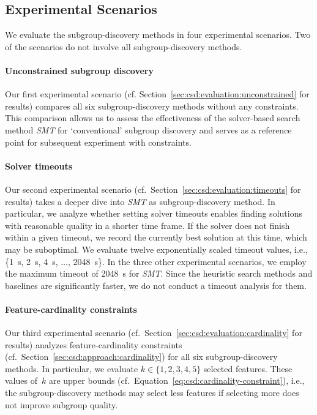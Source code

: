 \documentclass{article}
\theoremstyle{definition}
\begin{document}
\subsection{Experimental Scenarios}
\label{sec:csd:experimental-design:scenarios}

We evaluate the subgroup-discovery methods in four experimental scenarios.
Two of the scenarios do not involve all subgroup-discovery methods.

\paragraph{Unconstrained subgroup discovery}

Our first experimental scenario (cf. Section~\ref{sec:csd:evaluation:unconstrained} for results) compares all six subgroup-discovery methods without any constraints.
This comparison allows us to assess the effectiveness of the solver-based search method \emph{SMT} for `conventional' subgroup discovery and serves as a reference point for subsequent experiment with constraints.

\paragraph{Solver timeouts}

Our second experimental scenario (cf.~Section~\ref{sec:csd:evaluation:timeouts} for results) takes a deeper dive into \emph{SMT} as subgroup-discovery method.
In particular, we analyze whether setting solver timeouts enables finding solutions with reasonable quality in a shorter time frame.
If the solver does not finish within a given timeout, we record the currently best solution at this time, which may be suboptimal.
We evaluate twelve exponentially scaled timeout values, i.e., \{1~s, 2~s, 4~s, $\dots$, 2048~s\}.
In the three other experimental scenarios, we employ the maximum timeout of 2048~s for \emph{SMT}.
Since the heuristic search methods and baselines are significantly faster, we do not conduct a timeout analysis for them.

\paragraph{Feature-cardinality constraints}

Our third experimental scenario (cf.~Section~\ref{sec:csd:evaluation:cardinality} for results) analyzes feature-cardinality constraints (cf.~Section~\ref{sec:csd:approach:cardinality}) for all six subgroup-discovery methods.
In particular, we evaluate $k \in \{1, 2, 3, 4, 5\}$ selected features.
These values of~$k$ are upper bounds (cf.~Equation~\ref{eq:csd:cardinality-constraint}), i.e., the subgroup-discovery methods may select less features if selecting more does not improve subgroup quality.
\end{document}
